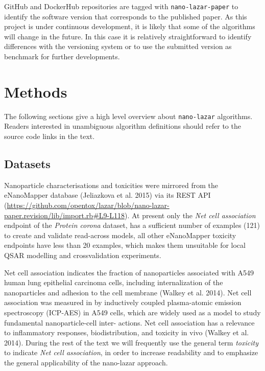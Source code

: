 \documentclass[utf8]{frontiersHLTH} %
\begin{document}
GitHub and DockerHub repositories are tagged with
\texttt{nano-lazar-paper} to identify the software version that
corresponds to the published paper. As this project is under continuous
development, it is likely that some of the algorithms will change in the
future. In this case it is relatively straightforward to identify
differences with the versioning system or to use the submitted version
as benchmark for further developments.

\section{Methods}\label{methods}

The following sections give a high level overview about
\texttt{nano-lazar} algorithms. Readers interested in unambiguous
algorithm definitions should refer to the source code links in the text.

\subsection{Datasets}\label{datasets}

Nanoparticle characterisations and toxicities were mirrored from the
eNanoMapper database (Jeliazkova et al. 2015) via its REST API
(\url{https://github.com/opentox/lazar/blob/nano-lazar-paper.revision/lib/import.rb\#L9-L118}).
At present only the \emph{Net cell association} endpoint of the
\emph{Protein corona} dataset, has a sufficient number of examples (121)
to create and validate read-across models, all other eNanoMapper
toxicity endpoints have less than 20 examples, which makes them
unsuitable for local QSAR modelling and crossvalidation experiments.

Net cell association indicates the fraction of nanoparticles associated
with A549 human lung epithelial carcinoma cells, including
internalization of the nanoparticles and adhesion to the cell membrane
(Walkey et al. 2014). Net cell association was measured in by
inductively coupled plasma-atomic emission spectroscopy (ICP-AES) in
A549 cells, which are widely used as a model to study fundamental
nanoparticle-cell inter- actions. Net cell association has a relevance
to inflammatory responses, biodistribution, and toxicity in vivo (Walkey
et al. 2014). During the rest of the text we will frequently use the
general term \emph{toxicity} to indicate \emph{Net cell association}, in
order to increase readability and to emphasize the general applicability
of the nano-lazar approach.
\end{document}
